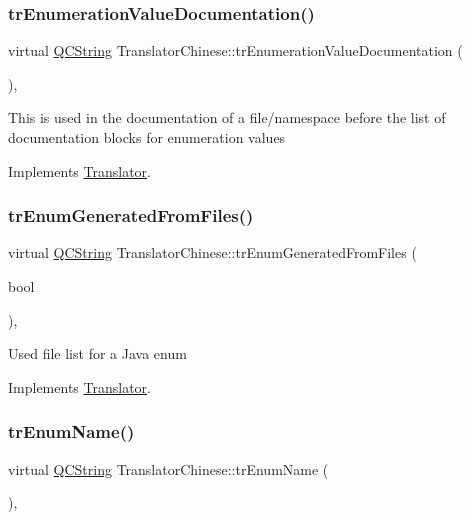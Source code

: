 \subsubsection{\texorpdfstring{trEnumerationValueDocumentation()}{trEnumerationValueDocumentation()}}
{\footnotesize\ttfamily virtual \mbox{\hyperlink{class_q_c_string}{Q\+C\+String}} Translator\+Chinese\+::tr\+Enumeration\+Value\+Documentation (\begin{DoxyParamCaption}{ }\end{DoxyParamCaption})\hspace{0.3cm}{\ttfamily [inline]}, {\ttfamily [virtual]}}

This is used in the documentation of a file/namespace before the list of documentation blocks for enumeration values 

Implements \mbox{\hyperlink{class_translator}{Translator}}.

\mbox{\label{class_translator_chinese_aee5fca73a548ac964fc4869d5915ff10}} 
\subsubsection{\texorpdfstring{trEnumGeneratedFromFiles()}{trEnumGeneratedFromFiles()}}
{\footnotesize\ttfamily virtual \mbox{\hyperlink{class_q_c_string}{Q\+C\+String}} Translator\+Chinese\+::tr\+Enum\+Generated\+From\+Files (\begin{DoxyParamCaption}\item[{bool}]{ }\end{DoxyParamCaption})\hspace{0.3cm}{\ttfamily [inline]}, {\ttfamily [virtual]}}

Used file list for a Java enum 

Implements \mbox{\hyperlink{class_translator}{Translator}}.

\mbox{\label{class_translator_chinese_a9595d41e3a338e6e71d6e52cb215f73e}} 
\subsubsection{\texorpdfstring{trEnumName()}{trEnumName()}}
{\footnotesize\ttfamily virtual \mbox{\hyperlink{class_q_c_string}{Q\+C\+String}} Translator\+Chinese\+::tr\+Enum\+Name (\begin{DoxyParamCaption}{ }\end{DoxyParamCaption})\hspace{0.3cm}{\ttfamily [inline]}, {\ttfamily [virtual]}}

